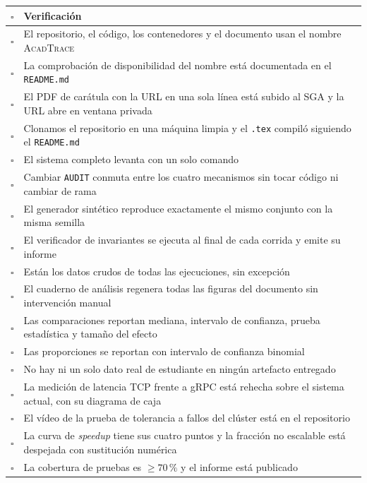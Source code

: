 \documentclass[11pt,a4paper]{article}
\begin{document}
	\begin{center}
		\small
		\begin{longtable}{@{}p{0.7cm}p{14.2cm}@{}}
			\toprule
			\textbf{$\square$} & \textbf{Verificación} \\
			\midrule
			\endhead
			$\square$ & El repositorio, el código, los contenedores y el documento usan el nombre \textsc{AcadTrace} \\
			$\square$ & La comprobación de disponibilidad del nombre está documentada en el \texttt{README.md} \\
			$\square$ & El PDF de carátula con la URL en una sola línea está subido al SGA y la URL abre en ventana privada \\
			$\square$ & Clonamos el repositorio en una máquina limpia y el \texttt{.tex} compiló siguiendo el \texttt{README.md} \\
			$\square$ & El sistema completo levanta con un solo comando \\
			$\square$ & Cambiar \texttt{AUDIT} conmuta entre los cuatro mecanismos sin tocar código ni cambiar de rama \\
			$\square$ & El generador sintético reproduce exactamente el mismo conjunto con la misma semilla \\
			$\square$ & El verificador de invariantes se ejecuta al final de cada corrida y emite su informe \\
			$\square$ & Están los datos crudos de todas las ejecuciones, sin excepción \\
			$\square$ & El cuaderno de análisis regenera todas las figuras del documento sin intervención manual \\
			$\square$ & Las comparaciones reportan mediana, intervalo de confianza, prueba estadística y tamaño del efecto \\
			$\square$ & Las proporciones se reportan con intervalo de confianza binomial \\
			$\square$ & No hay ni un solo dato real de estudiante en ningún artefacto entregado \\
			$\square$ & La medición de latencia TCP frente a gRPC está rehecha sobre el sistema actual, con su diagrama de caja \\
			$\square$ & El vídeo de la prueba de tolerancia a fallos del clúster está en el repositorio \\
			$\square$ & La curva de \emph{speedup} tiene sus cuatro puntos y la fracción no escalable está despejada con sustitución numérica \\
			$\square$ & La cobertura de pruebas es $\geq 70\,\%$ y el informe está publicado \\

\end{longtable}
\end{center}
\end{document}
